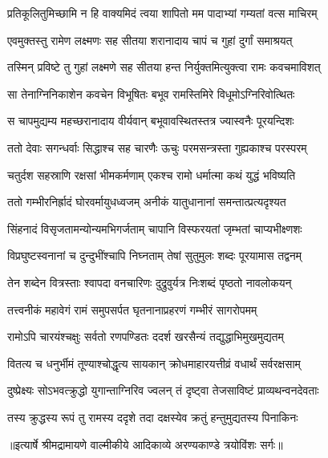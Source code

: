 \twolineshloka
{प्रतिकूलितुमिच्छामि न हि वाक्यमिदं त्वया}
{शापितो मम पादाभ्यां गम्यतां वत्स माचिरम्} %

\twolineshloka
{एवमुक्तस्तु रामेण लक्ष्मणः सह सीतया}
{शरानादाय चापं च गुहां दुर्गां समाश्रयत्} %

\twolineshloka
{तस्मिन् प्रविष्टे तु गुहां लक्ष्मणे सह सीतया}
{हन्त निर्युक्तमित्युक्त्वा रामः कवचमाविशत्} %

\twolineshloka
{सा तेनाग्निनिकाशेन कवचेन विभूषितः}
{बभूव रामस्तिमिरे विधूमोऽग्निरिवोत्थितः} %

\twolineshloka
{स चापमुद्यम्य महच्छरानादाय वीर्यवान्}
{बभूवावस्थितस्तत्र ज्यास्वनैः पूरयन्दिशः} %

\twolineshloka
{ततो देवाः सगन्धर्वाः सिद्धाश्च सह चारणैः}
{ऊचुः परमसन्त्रस्ता गुह्यकाश्च परस्परम्} %

\twolineshloka
{चतुर्दश सहस्राणि रक्षसां भीमकर्मणाम्}
{एकश्च रामो धर्मात्मा कथं युद्धं भविष्यति} %

\twolineshloka
{ततो गम्भीरनिर्ह्रादं घोरवर्मायुधध्वजम्}
{अनीकं यातुधानानां समन्तात्प्रत्यदृश्यत} %

\twolineshloka
{सिंहनादं विसृजतामन्योन्यमभिगर्जताम्}
{चापानि विस्फरयतां जृम्भतां चाप्यभीक्ष्णशः} %

\twolineshloka
{विप्रघुष्टस्वनानां च दुन्दुभींश्चापि निघ्नताम्}
{तेषां सुतुमुलः शब्दः पूरयामास तद्वनम्} %

\twolineshloka
{तेन शब्देन वित्रस्ताः श्वापदा वनचारिणः}
{दुद्रुवुर्यत्र निःशब्दं पृष्ठतो नावलोकयन्} %

\twolineshloka
{तत्त्वनीकं महावेगं रामं समुपसर्पत}
{घृतनानाप्रहरणं गम्भीरं सागरोपमम्} %

\twolineshloka
{रामोऽपि चारयंश्चक्षुः सर्वतो रणपण्डितः}
{ददर्श खरसैन्यं तद्युद्धाभिमुखमुद्यतम्} %

\twolineshloka
{वितत्य च धनुर्भीमं तूण्याश्चोद्धृत्य सायकान्}
{क्रोधमाहारयत्तीव्रं वधार्थं सर्वरक्षसाम्} %

\twolineshloka
{दुष्प्रेक्ष्यः सोऽभवत्क्रुद्धो युगान्ताग्निरिव ज्वलन्}
{तं दृष्ट्वा तेजसाविष्टं प्राव्यथन्वनदेवताः} %

\twolineshloka
{तस्य क्रुद्धस्य रूपं तु रामस्य ददृशे तदा}
{दक्षस्येव क्रतुं हन्तुमुद्यतस्य पिनाकिनः} %


{॥इत्यार्षे श्रीमद्रामायणे वाल्मीकीये आदिकाव्ये अरण्यकाण्डे त्रयोविंशः सर्गः॥}


